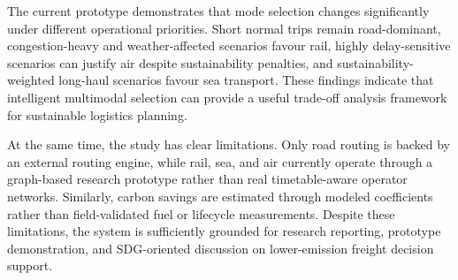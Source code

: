 The current prototype demonstrates that mode selection changes significantly under different operational priorities. Short normal trips remain road-dominant, congestion-heavy and weather-affected scenarios favour rail, highly delay-sensitive scenarios can justify air despite sustainability penalties, and sustainability-weighted long-haul scenarios favour sea transport. These findings indicate that intelligent multimodal selection can provide a useful trade-off analysis framework for sustainable logistics planning.

At the same time, the study has clear limitations. Only road routing is backed by an external routing engine, while rail, sea, and air currently operate through a graph-based research prototype rather than real timetable-aware operator networks. Similarly, carbon savings are estimated through modeled coefficients rather than field-validated fuel or lifecycle measurements. Despite these limitations, the system is sufficiently grounded for research reporting, prototype demonstration, and SDG-oriented discussion on lower-emission freight decision support.

